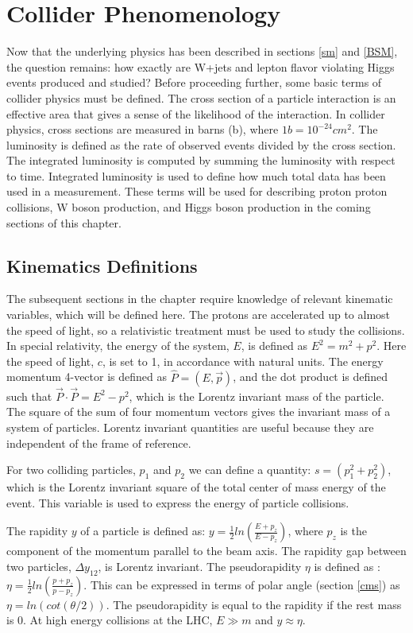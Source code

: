 \documentclass[oneside, letterpaper, oldfontcommands]{memoir}
\begin{document}
\chapter{Collider Phenomenology}\label{pheno}
\qquad Now that the underlying physics has been described in sections \ref{sm} and \ref{BSM}, the question remains: how exactly are W+jets and lepton flavor violating Higgs events produced and studied? Before proceeding further, some basic terms of collider physics must be defined. The cross section of a particle interaction is an effective area that gives a sense of the likelihood of the interaction. In collider physics, cross sections are measured in barns (b), where $1b = 10^{-24}cm^{2}$. The luminosity is defined as the rate of observed events divided by the cross section. The integrated luminosity is computed by summing the luminosity with respect to time. Integrated luminosity is used to define how much total data has been used in a measurement. These terms will be used for describing proton proton collisions, W boson production, and Higgs boson production in the coming sections of this chapter.

\section{Kinematics Definitions}\label{kindef}
\qquad The subsequent sections in the chapter require knowledge of relevant kinematic variables, which will be defined here. The protons are accelerated up to almost the speed of light, so a relativistic treatment must be used to study the collisions.   In special relativity, the energy of the system, $E$, is defined as $E^{2} = m^{2}+p^{2}$. Here the speed of light, $c$, is set to 1, in accordance with natural units. The energy momentum 4-vector is defined as $ \hat{P} = (E, \vec{p})$, and the dot product is defined such that $\vec{P} \cdot \vec{P} = E^{2}-p^{2}$, which is the Lorentz invariant mass of the particle. The square of the sum of four momentum vectors gives the invariant mass of a system of particles. Lorentz invariant quantities are useful because they are independent of the frame of reference. 

\qquad For two colliding particles, $p_{1}$ and $p_{2}$ we can define a quantity: $s = (p_{1}^2+p_{2}^2)$, which is the Lorentz invariant square of the total center of mass energy of the event. This variable is used to express the energy of particle collisions.

\qquad The rapidity $y$ of a particle is defined as: $y = \frac{1}{2}ln(\frac{E+p_{z}}{E-p_{z}})$, where $p_{z}$ is the component of the momentum parallel to the beam axis. The rapidity gap between two particles, $\Delta y_{12}$, is Lorentz invariant. The pseudorapidity $\eta$ is defined as : $\eta = \frac{1}{2}ln(\frac{p+p_{z}}{p-p_{z}})$. This can be expressed in terms of polar angle (section \ref{cms}) as $\eta = ln(cot(\theta /2))$. The pseudorapidity is equal to the rapidity if the rest mass is 0. At high energy collisions at the LHC, $E \gg m$ and $y \approx \eta$.
\end{document}
